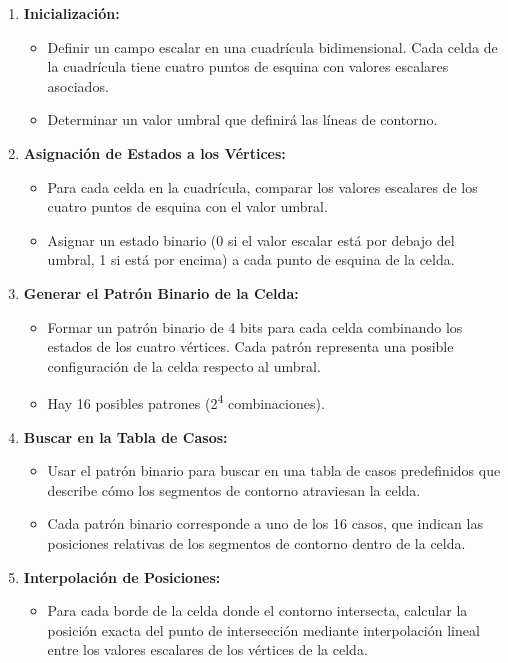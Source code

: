 \documentclass{article}
\begin{document}
\begin{enumerate}
    \item \textbf{Inicialización:}
    \begin{itemize}
        \item Definir un campo escalar en una cuadrícula bidimensional. Cada celda de la cuadrícula tiene cuatro puntos de esquina con valores escalares asociados.
        \item Determinar un valor umbral que definirá las líneas de contorno.
    \end{itemize}
    \item \textbf{Asignación de Estados a los Vértices:}
    \begin{itemize}
        \item Para cada celda en la cuadrícula, comparar los valores escalares de los cuatro puntos de esquina con el valor umbral.
        \item Asignar un estado binario (0 si el valor escalar está por debajo del umbral, 1 si está por encima) a cada punto de esquina de la celda.
    \end{itemize}
    \item \textbf{Generar el Patrón Binario de la Celda:}
    \begin{itemize}
        \item Formar un patrón binario de 4 bits para cada celda combinando los estados de los cuatro vértices. Cada patrón representa una posible configuración de la celda respecto al umbral.
        \item Hay 16 posibles patrones (2\textsuperscript{4} combinaciones).
    \end{itemize}
    \item \textbf{Buscar en la Tabla de Casos:}
    \begin{itemize}
        \item Usar el patrón binario para buscar en una tabla de casos predefinidos que describe cómo los segmentos de contorno atraviesan la celda.
        \item Cada patrón binario corresponde a uno de los 16 casos, que indican las posiciones relativas de los segmentos de contorno dentro de la celda.
    \end{itemize}
    \item \textbf{Interpolación de Posiciones:}
    \begin{itemize}
        \item Para cada borde de la celda donde el contorno intersecta, calcular la posición exacta del punto de intersección mediante interpolación lineal entre los valores escalares de los vértices de la celda.

\end{itemize}
\end{enumerate}
\end{document}
